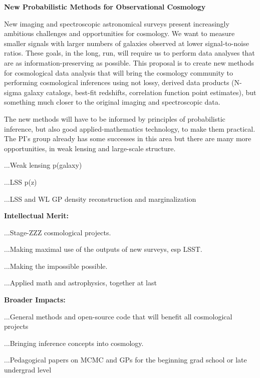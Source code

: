 \documentclass[12pt]{article}
\begin{document}
\sloppy\sloppypar\thispagestyle{empty}

\noindent
\textbf{New Probabilistic Methods for Observational Cosmology}
\smallskip

New imaging and spectroscopic astronomical surveys present
increasingly ambitious challenges and opportunities for cosmology.
We want to measure smaller signals with larger numbers of galaxies
observed at lower signal-to-noise ratios.
These goals, in the long, run, will require us to perform data
analyses that are as information-preserving as possible.
This proposal is to create new methods for cosmological data analysis
that will bring the cosmology community to performing cosmological
inferences using not lossy, derived data products (N-sigma galaxy
catalogs, best-fit redshifts, correlation function point estimates),
but something much closer to the original imaging and spectroscopic
data.

The new methods will have to be informed by principles of
probabilistic inference, but also good applied-mathematics technology,
to make them practical.
The PI's group already has some successes in this area but there are
many more opportunities, in weak lensing and large-scale structure.

...Weak lensing p(galaxy)

...LSS p(z)

...LSS and WL GP density reconstruction and marginalization

\noindent
\textbf{Intellectual Merit:}

...Stage-ZZZ cosmological projects.

...Making maximal use of the outputs of new surveys, esp LSST.

...Making the impossible possible.

...Applied math and astrophysics, together at last

\noindent
\textbf{Broader Impacts:}

...General methods and open-source code that will benefit all cosmological projects

...Bringing inference concepts into cosmology.

...Pedagogical papers on MCMC and GPs for the beginning grad school or late undergrad level
\end{document}
